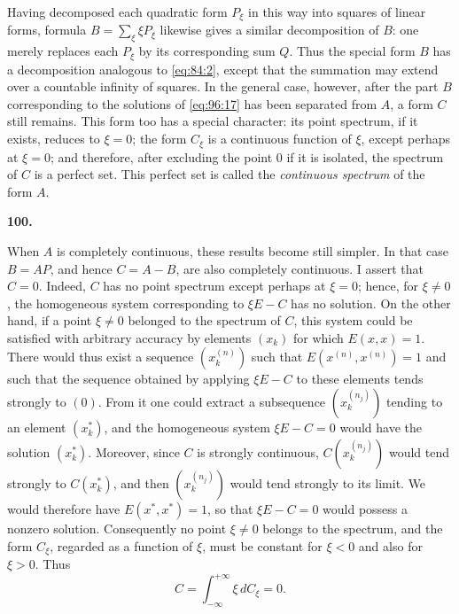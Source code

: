 \documentclass[
  paper=b5,
  fontsize=13pt,
  twoside=true,
  open=any,
  bookmarkpackage=false,
  chapterprefix=true,
  headings=normal
]{scrbook}
\theoremstyle{definition}
\newcommand{\numberedparagraph}[1]{%
  \par\medskip\phantomsection\label{sec:#1}%
  \noindent\textbf{#1.}\enspace
}
\begin{document}
Having decomposed each quadratic form \(P_\xi\) in this way into squares of
linear forms, formula \(B=\sum_\xi\xi P_\xi\) likewise gives a similar
decomposition of \(B\): one merely replaces each \(P_\xi\) by its corresponding
sum \(Q\).  Thus the special form \(B\) has a decomposition analogous to
\eqref{eq:84:2}, except that the summation may extend over a countable infinity
of squares.  In the general case, however, after the part \(B\) corresponding
to the solutions of \eqref{eq:96:17} has been separated from \(A\), a form
\(C\) still remains.  This form too has a special character: its point
spectrum, if it exists, reduces to \(\xi=0\); the form \(C_\xi\) is a
continuous function of \(\xi\), except perhaps at \(\xi=0\); and therefore,
after excluding the point \(0\) if it is isolated, the spectrum of \(C\) is a
perfect set.  This perfect set is called the \emph{continuous spectrum} of the
form \(A\).

\numberedparagraph{100}
When \(A\) is completely continuous, these results become still simpler.  In
that case \(B=AP\), and hence \(C=A-B\), are also completely continuous.  I
assert that \(C=0\).  Indeed, \(C\) has no point spectrum except perhaps at
\(\xi=0\); hence, for \(\xi\ne0\), the homogeneous system corresponding to
\(\xi E-C\) has no solution.  On the other hand, if a point \(\xi\ne0\)
belonged to the spectrum of \(C\), this system could be satisfied with
arbitrary accuracy by elements \((x_k)\) for which \(E(x,x)=1\).  There would
thus exist a sequence \((x_k^{(n)})\) such that
\(E(x^{(n)},x^{(n)})=1\) and such that the sequence obtained by applying
\(\xi E-C\) to these elements tends strongly to \((0)\).  From it one could
extract a subsequence \((x_k^{(n_j)})\) tending to an element \((x_k^*)\), and
the homogeneous system \(\xi E-C=0\) would have the solution \((x_k^*)\).
Moreover, since \(C\) is strongly continuous,
\(C(x_k^{(n_j)})\) would tend strongly to \(C(x_k^*)\), and then
\((x_k^{(n_j)})\) would tend strongly to its limit.  We would therefore have
\(E(x^*,x^*)=1\), so that \(\xi E-C=0\) would possess a nonzero solution.
Consequently no point \(\xi\ne0\) belongs to the spectrum, and the form
\(C_\xi\), regarded as a function of \(\xi\),
must be constant for \(\xi<0\) and also for \(\xi>0\).  Thus
\[
  C=\int_{-\infty}^{+\infty}\xi\,dC_\xi=0.
\]
\end{document}
